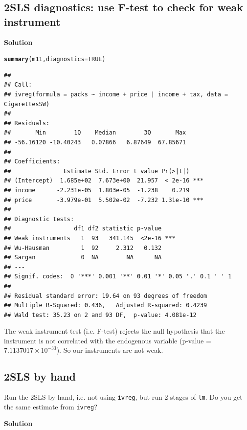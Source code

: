 \documentclass{article}\usepackage[]{graphicx}\usepackage[]{color}
\makeatletter
\newcommand{\hlnum}[1]{\textcolor[rgb]{0.686,0.059,0.569}{#1}}%
\newcommand{\hlstd}[1]{\textcolor[rgb]{0.345,0.345,0.345}{#1}}%
\newcommand{\hlkwc}[1]{\textcolor[rgb]{0.333,0.667,0.333}{#1}}%
\newcommand{\hlkwd}[1]{\textcolor[rgb]{0.737,0.353,0.396}{\textbf{#1}}}%
\newenvironment{kframe}{%
 \def\at@end@of@kframe{}%
 \ifinner\ifhmode%
  \def\at@end@of@kframe{\end{minipage}}%
  \begin{minipage}{\columnwidth}%
 \fi\fi%
 \def\FrameCommand##1{\hskip\@totalleftmargin \hskip-\fboxsep
 \colorbox{shadecolor}{##1}\hskip-\fboxsep
     \hskip-\linewidth \hskip-\@totalleftmargin \hskip\columnwidth}%
 \MakeFramed {\advance\hsize-\width
   \@totalleftmargin\z@ \linewidth\hsize
   \@setminipage}}%
 {\par\unskip\endMakeFramed%
 \at@end@of@kframe}
\newenvironment{knitrout}{}{} %
\makeatother
\begin{document}
\subsection{2SLS diagnostics: use F-test to check for weak instrument}

\textbf{Solution}

\begin{knitrout}
\color{fgcolor}\begin{kframe}
\begin{alltt}
\hlkwd{summary}\hlstd{(m11,} \hlkwc{diagnostics} \hlstd{=} \hlnum{TRUE}\hlstd{)}
\end{alltt}
\begin{verbatim}
## 
## Call:
## ivreg(formula = packs ~ income + price | income + tax, data = CigarettesSW)
## 
## Residuals:
##       Min        1Q    Median        3Q       Max 
## -56.16120 -10.40243   0.07866   6.87649  67.85671 
## 
## Coefficients:
##               Estimate Std. Error t value Pr(>|t|)    
## (Intercept)  1.685e+02  7.673e+00  21.957  < 2e-16 ***
## income      -2.231e-05  1.803e-05  -1.238    0.219    
## price       -3.979e-01  5.502e-02  -7.232 1.31e-10 ***
## 
## Diagnostic tests:
##                  df1 df2 statistic p-value    
## Weak instruments   1  93   341.145  <2e-16 ***
## Wu-Hausman         1  92     2.312   0.132    
## Sargan             0  NA        NA      NA    
## ---
## Signif. codes:  0 '***' 0.001 '**' 0.01 '*' 0.05 '.' 0.1 ' ' 1
## 
## Residual standard error: 19.64 on 93 degrees of freedom
## Multiple R-Squared: 0.436,	Adjusted R-squared: 0.4239 
## Wald test: 35.23 on 2 and 93 DF,  p-value: 4.081e-12
\end{verbatim}
\end{kframe}
\end{knitrout}

The weak instrument test (i.e. F-test) rejects the null hypothesis that the instrument is not correlated with the endogenous variable (p-value = \ensuremath{7.1137017\times 10^{-33}}). So our instruments are not weak.

\subsection{2SLS by hand}

Run the 2SLS by hand, i.e. not using \verb`ivreg`, but run 2 stages of \verb`lm`. Do you get the same estimate from \verb`ivreg`?

\textbf{Solution}
\end{document}

